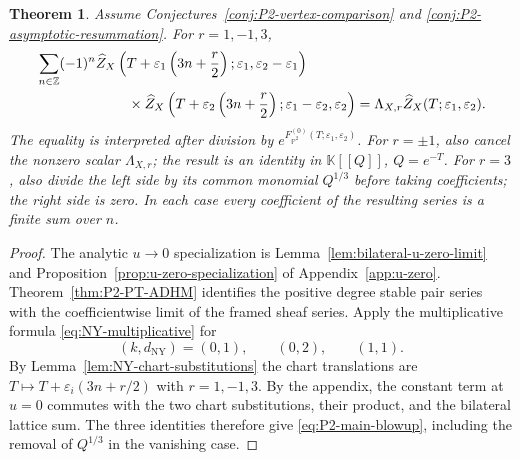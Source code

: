 \documentclass{amsart}
\newtheorem{theorem}{Theorem}
\theoremstyle{definition}
\numberwithin{equation}{section}
\newcommand{\Z}{\mathbb Z}
\newcommand{\K}{\mathbb K}
\newcommand{\eps}{\varepsilon}
\begin{document}
\begin{theorem}
\label{thm:P2-blowup-main}
Assume Conjectures~\ref{conj:P2-vertex-comparison} and \ref{conj:P2-asymptotic-resummation}.  For \(r=1,-1,3\),
\begin{equation}
\begin{aligned}
 &\sum_{n\in\Z}(-1)^n
 \widehat Z_X\left(
 T+\eps_1\left(3n+\frac r2\right);
 \eps_1,\eps_2-\eps_1\right)\\
 &\hspace{23mm}\times
 \widehat Z_X\left(
 T+\eps_2\left(3n+\frac r2\right);
 \eps_1-\eps_2,\eps_2\right)
 =\Lambda_{X,r}\widehat Z_X(T;\eps_1,\eps_2).
\end{aligned}
\label{eq:P2-main-blowup}
\end{equation}
The equality is interpreted after division by
\(e^{F_{\mathbb P^2}^{(0)}(T;\eps_1,\eps_2)}\).
For \(r=\pm1\), also cancel the nonzero scalar \(\Lambda_{X,r}\); the result is an identity in \(\K[[Q]]\), \(Q=e^{-T}\).
For \(r=3\), also divide the left side by its common monomial \(Q^{1/3}\) before taking coefficients; the right side is zero.  In each case every coefficient of the resulting series is a finite sum over \(n\).
\end{theorem}

\begin{proof}
The analytic \(u\to0\) specialization is Lemma~\ref{lem:bilateral-u-zero-limit} and Proposition~\ref{prop:u-zero-specialization} of Appendix~\ref{app:u-zero}.  Theorem~\ref{thm:P2-PT-ADHM} identifies the positive degree stable pair series with the coefficientwise limit of the framed sheaf series.  Apply the multiplicative formula \eqref{eq:NY-multiplicative} for
\[
 (k,d_{\mathrm{NY}})=(0,1),\qquad(0,2),\qquad(1,1).
\]
By Lemma~\ref{lem:NY-chart-substitutions} the chart translations are \(T\mapsto T+\eps_i(3n+r/2)\) with \(r=1,-1,3\).  By the appendix, the constant term at \(u=0\) commutes with the two chart substitutions, their product, and the bilateral lattice sum.  The three identities therefore give \eqref{eq:P2-main-blowup}, including the removal of \(Q^{1/3}\) in the vanishing case.
\end{proof}
\end{document}
